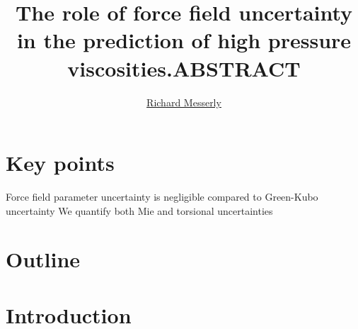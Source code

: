 \documentclass[11pt,a4paper]{article}
\begin{document}
	\thispagestyle{empty}
	\title{\Large \textbf{The role of force field uncertainty in the prediction of high pressure viscosities.}}
	\author[1]{\large {\underline{Richard Messerly}}}%
	
	
	\date{} %
	\maketitle\thispagestyle{empty} %
	\begin{center}
		\title{\textbf{ABSTRACT}}\centering{}
	\end{center}
	\justify
	
\section*{Key points}

Force field parameter uncertainty is negligible compared to Green-Kubo uncertainty
We quantify both Mie and torsional uncertainties

\section*{Outline}

\section{Introduction}
\end{document}
